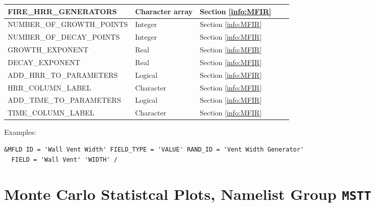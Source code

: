 \begin{landscape}
\begin{longtable}{|l|l|l|l|l|}
{\ct FIRE\_HRR\_GENERATORS}                                 & Character array   & Section \ref{info:MFIR}   &      &     \\ \hline
{\ct NUMBER\_OF\_GROWTH\_POINTS}                            & Integer           & Section \ref{info:MFIR}   &      &     \\ \hline
{\ct NUMBER\_OF\_DECAY\_POINTS}                             & Integer           & Section \ref{info:MFIR}   &      &     \\ \hline
{\ct GROWTH\_EXPONENT}                                      & Real              & Section \ref{info:MFIR}   &      &     \\ \hline
{\ct DECAY\_EXPONENT}                                       & Real              & Section \ref{info:MFIR}   &      &     \\ \hline
{\ct ADD\_HRR\_TO\_PARAMETERS}                              & Logical           & Section \ref{info:MFIR}   &      &     \\ \hline
{\ct HRR\_COLUMN\_LABEL}                                    & Character         & Section \ref{info:MFIR}   &      &     \\ \hline
{\ct ADD\_TIME\_TO\_PARAMETERS}                             & Logical           & Section \ref{info:MFIR}   &      &     \\ \hline
{\ct TIME\_COLUMN\_LABEL}                                   & Character         & Section \ref{info:MFIR}   &      &     \\ \hline


\end{longtable}
\end{landscape}
\noindent Examples:
\begin{lstlisting}
&MFLD ID = 'Wall Vent Width' FIELD_TYPE = 'VALUE' RAND_ID = 'Vent Width Generator'
  FIELD = 'Wall Vent' 'WIDTH' /
\end{lstlisting}


\clearpage

\section{Monte Carlo Statistcal Plots, Namelist Group \texorpdfstring{{\tt MSTT}}{MSTT}}

